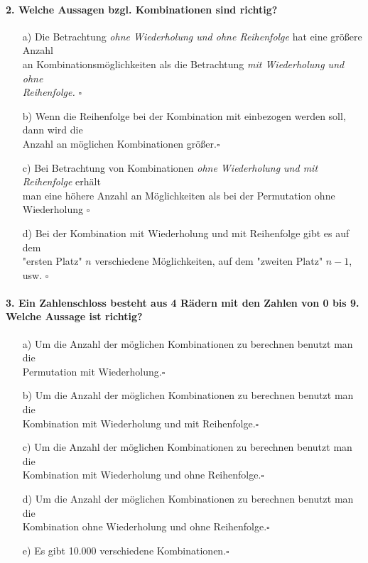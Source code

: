 \documentclass[a4paper]{article}
\begin{document}
\paragraph{2. Welche Aussagen bzgl. Kombinationen sind richtig?}
\begin{itemize}
    \item [a)] Die Betrachtung \textit{ohne Wiederholung und ohne Reihenfolge} hat eine größere Anzahl \\ an Kombinationsmöglichkeiten als die Betrachtung \textit{mit Wiederholung und ohne \\Reihenfolge.} \hfill $\square$
    \item[b)] Wenn die Reihenfolge bei der Kombination mit einbezogen werden soll, dann wird die \\Anzahl an möglichen Kombinationen größer.\hfill $\square$
    \item[c)] Bei Betrachtung von Kombinationen \textit{ohne Wiederholung und mit Reihenfolge} erhält\\ man eine höhere Anzahl an Möglichkeiten als bei der Permutation ohne Wiederholung \hfill $\square$
    \item[d)] Bei der Kombination mit Wiederholung und mit Reihenfolge gibt es auf dem \\"ersten Platz" $n$ verschiedene Möglichkeiten, auf dem "zweiten Platz" $n-1$, usw. \hfill $\square$
\end{itemize}

\paragraph{3. Ein Zahlenschloss besteht aus 4 Rädern mit den Zahlen von 0 bis 9. Welche Aussage ist richtig?}
\begin{itemize}
    \item[a)] Um die Anzahl der möglichen Kombinationen zu berechnen benutzt man die\\ Permutation mit Wiederholung.\hfill $\square$
    \item[b)] Um die Anzahl der möglichen Kombinationen zu berechnen benutzt man die\\ Kombination mit Wiederholung und mit Reihenfolge.\hfill $\square$
    \item[c)] Um die Anzahl der möglichen Kombinationen zu berechnen benutzt man die\\ Kombination mit Wiederholung und ohne Reihenfolge.\hfill $\square$
    \item[d)] Um die Anzahl der möglichen Kombinationen zu berechnen benutzt man die\\ Kombination ohne Wiederholung und ohne Reihenfolge.\hfill $\square$
    \item[e)] Es gibt 10.000 verschiedene Kombinationen.\hfill $\square$
\end{itemize}
\end{document}
